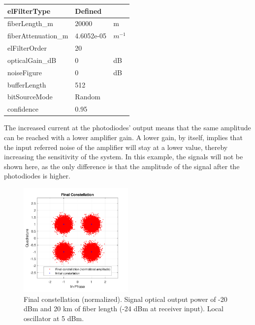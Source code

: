 \begin{longtable}[h]{|l|l|l|}
	elFilterType                  & Defined              & \\\hline
	fiberLength\_m                & $20 000$             & m \\\hline
	fiberAttenuation\_m           & 4.6052e-05           & $m^{-1}$ \\\hline
	elFilterOrder                 & 20                   & \\\hline
	opticalGain\_dB               & 0                    & dB \\\hline
	noiseFigure                   & 0                    & dB \\\hline
	bufferLength                  & 512                  & \\\hline
	bitSourceMode                 & Random               & \\\hline
	confidence                    & 0.95                 & \\\hline
\end{longtable}

The increased current at the photodiodes' output means that the same amplitude 
can be reached with a lower amplifier gain. A lower gain, by itself, implies 
that the input referred noise of the amplifier will stay at a lower value, 
thereby increasing the sensitivity of the system.
In this example, the signals will not be shown here, as the only difference is 
that the amplitude of the signal after the photodiodes is higher.

\begin{figure}[H]
	\centering
	\includegraphics[width=0.5\textwidth]
	{sdf/m_qam_system/figures/simulations/04_incLO/constFinal.pdf}
	\caption{Final constellation (normalized). Signal optical output power of -20 
	dBm and 20 
		km of fiber length (-24 dBm at receiver 
		input). Local oscillator at 5 dBm.}\label{fig:incLO_constFinal}
\end{figure}

